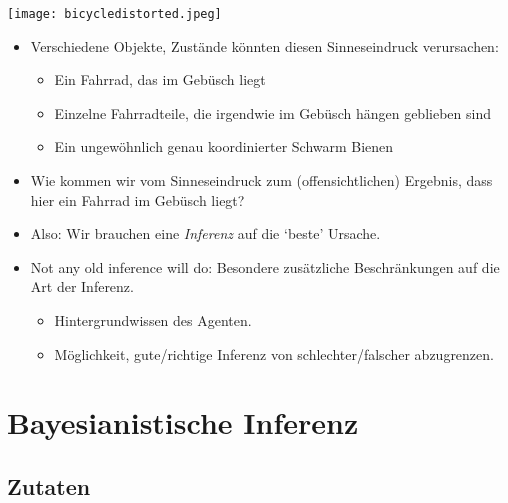 \documentclass[12pt, handout]{beamer}
\begin{document}
\begin{frame}[plain]
  \begin{center}
    \texttt{[image: bicycledistorted.jpeg]}
  \end{center}
\end{frame}

\begin{frame}
  \begin{itemize}[<+->]
  \item Verschiedene Objekte, Zustände könnten diesen Sinneseindruck
    verursachen:
    \begin{itemize}[<+->]
    \item Ein Fahrrad, das im Gebüsch liegt
    \item Einzelne Fahrradteile, die irgendwie im Gebüsch hängen
      geblieben sind
    \item Ein ungewöhnlich genau koordinierter Schwarm Bienen
    \end{itemize}
  \item Wie kommen wir vom Sinneseindruck zum (offensichtlichen)
    Ergebnis, dass hier ein Fahrrad im Gebüsch liegt?
  \end{itemize}

\end{frame}


\begin{frame}
  \begin{itemize}[<+->]
  \item Also: Wir brauchen eine \emph{Inferenz} auf die `beste' Ursache.
  \item Not any old inference will do: Besondere zusätzliche
    Beschränkungen auf die Art der Inferenz.
    \begin{itemize}[<+->]
    \item Hintergrundwissen des Agenten.
    \item Möglichkeit, gute/richtige Inferenz von schlechter/falscher
      abzugrenzen.
    \end{itemize}
  \end{itemize}
\end{frame}

\section{Bayesianistische Inferenz}

\subsection{Zutaten}
\end{document}

